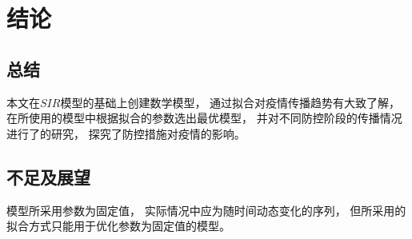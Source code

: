 \section{结论}
\subsection{总结}
本文在$SIR$模型的基础上创建数学模型，
通过拟合对疫情传播趋势有大致了解，
在所使用的模型中根据拟合的参数选出最优模型，
并对不同防控阶段的传播情况进行了的研究，
探究了防控措施对疫情的影响。
\subsection{不足及展望}
\par 模型所采用参数为固定值，
实际情况中应为随时间动态变化的序列，
但所采用的拟合方式只能用于优化参数为固定值的模型。